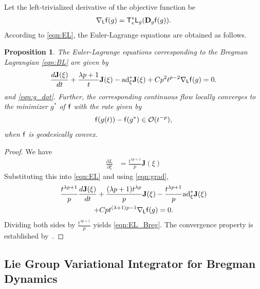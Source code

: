 \documentclass[letterpaper, 10pt, conference]{ieeeconf}
\newcommand{\deriv}[2]{\ensuremath{\frac{\partial #1}{\partial #2}}}
\newcommand{\T}{\ensuremath{\mathsf{T}}}
\renewcommand{\L}{\ensuremath{\mathsf{L}}}
\newcommand{\D}{\ensuremath{\mathbf{D}}}
\newcommand{\ad}{\ensuremath{\mathrm{ad}}}
\newtheorem{prop}{Proposition}
\begin{document}
Let the left-trivialized derivative of the objective function be
\begin{align}
    \nabla_\L \obj(g) = \T_e^*\L_g (\D_g \obj(g)).\label{eqn:grad}
\end{align}
According to \eqref{eqn:EL}, the Euler-Lagrange equations are obtained as follows.
\begin{prop}\label{prop:EL_Breg}
    The Euler-Lagrange equations corresponding to the Bregman Lagrangian \eqref{eqn:BL} are given by
    \begin{align}
        \frac{d \mathbf{J}(\xi)}{dt} + \frac{\lambda p+1}{t}\mathbf{J}(\xi) - \ad^*_\xi \mathbf{J}(\xi)
        + Cp^2 t^{p-2} \nabla_\L \obj (g) =0.\label{eqn:EL_Breg}
    \end{align}
    and \eqref{eqn:g_dot}. 
    Further, the corresponding continuous flow locally converges to the minimizer $g^*$ of $\mathsf{f}$ with the rate given by
    \begin{align}
        \mathsf{f}(g(t)) - \mathsf{f}(g^*) \in \mathcal{O}(t^{-p}),
    \end{align}
    when $\mathsf{f}$ is geodesically convex. 
\end{prop}
\begin{proof}
    We have
    \begin{align*}
        \deriv{L}{\xi} & = \frac{t^{\lambda p+1}}{p}\mathbf{J}(\xi)
    \end{align*}
    Substituting this into \eqref{eqn:EL} and using \eqref{eqn:grad}, 
    \begin{gather*}
        \frac{t^{\lambda p+1}}{p}\frac{d \mathbf{J}(\xi)}{dt} + \frac{(\lambda p+1)t^{\lambda p}}{p}\mathbf{J}(\xi) -\frac{t^{\lambda p+1}}{p} \ad^*_\xi \mathbf{J}(\xi) \\
        + Cpt^{(\lambda +1)p-1} \nabla_\L \obj(g) =0.
    \end{gather*}
    Dividing both sides by $\frac{t^{\lambda p+1}}{p}$ yields \eqref{eqn:EL_Breg}.
    The convergence property is established by~\cite[Theorem 3.2]{duruisseaux2021variational}.
\end{proof}

\subsection{Lie Group Variational Integrator for Bregman Dynamics}
\end{document}
